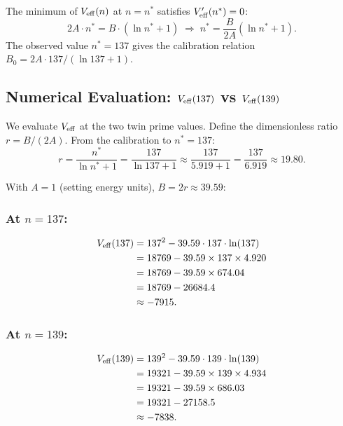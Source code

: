 \documentclass[12pt]{article}
\theoremstyle{definition}
\theoremstyle{remark}
\begin{document}
The minimum of $V_{\rm eff}(n)$ at $n = n^*$ satisfies $V_{\rm eff}'(n^*) = 0$:
\begin{equation}
  2A\cdot n^* = B\cdot (\ln n^* + 1)
  \;\Longrightarrow\;
  n^* = \frac{B}{2A}\left(\ln n^* + 1\right).
  \label{eq:minimum_condition}
\end{equation}
The observed value $n^* = 137$ gives the calibration relation
$B_0 = 2A\cdot 137 / (\ln 137 + 1)$.

\subsection{Numerical Evaluation: $V_{\rm eff}(137)$ vs $V_{\rm eff}(139)$}

We evaluate $V_{\rm eff}$ at the two twin prime values.  Define the dimensionless
ratio $r = B/(2A)$.  From the calibration to $n^* = 137$:
\begin{equation}
  r = \frac{n^*}{\ln n^* + 1} = \frac{137}{\ln 137 + 1} \approx \frac{137}{5.919 + 1} = \frac{137}{6.919} \approx 19.80.
  \label{eq:r_value}
\end{equation}

With $A = 1$ (setting energy units), $B = 2r \approx 39.59$:

\subsubsection{At $n = 137$:}
\begin{align}
  V_{\rm eff}(137) &= 137^2 - 39.59 \cdot 137 \cdot \ln(137) \notag\\
  &= 18769 - 39.59 \times 137 \times 4.920 \notag\\
  &= 18769 - 39.59 \times 674.04 \notag\\
  &= 18769 - 26684.4 \notag\\
  &\approx -7915.
  \label{eq:Veff137}
\end{align}

\subsubsection{At $n = 139$:}
\begin{align}
  V_{\rm eff}(139) &= 139^2 - 39.59 \cdot 139 \cdot \ln(139) \notag\\
  &= 19321 - 39.59 \times 139 \times 4.934 \notag\\
  &= 19321 - 39.59 \times 686.03 \notag\\
  &= 19321 - 27158.5 \notag\\
  &\approx -7838.
  \label{eq:Veff139}
\end{align}
\end{document}
